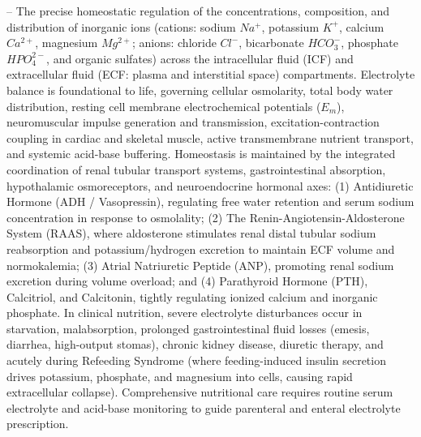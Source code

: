 -- The precise homeostatic regulation of the concentrations, composition, and distribution of inorganic ions (cations: sodium $Na^+$, potassium $K^+$, calcium $Ca^{2+}$, magnesium $Mg^{2+}$; anions: chloride $Cl^-$, bicarbonate $HCO_3^-$, phosphate $HPO_4^{2-}$, and organic sulfates) across the intracellular fluid (ICF) and extracellular fluid (ECF: plasma and interstitial space) compartments. Electrolyte balance is foundational to life, governing cellular osmolarity, total body water distribution, resting cell membrane electrochemical potentials ($E_m$), neuromuscular impulse generation and transmission, excitation-contraction coupling in cardiac and skeletal muscle, active transmembrane nutrient transport, and systemic acid-base buffering. Homeostasis is maintained by the integrated coordination of renal tubular transport systems, gastrointestinal absorption, hypothalamic osmoreceptors, and neuroendocrine hormonal axes: (1) Antidiuretic Hormone (ADH / Vasopressin), regulating free water retention and serum sodium concentration in response to osmolality; (2) The Renin-Angiotensin-Aldosterone System (RAAS), where aldosterone stimulates renal distal tubular sodium reabsorption and potassium/hydrogen excretion to maintain ECF volume and normokalemia; (3) Atrial Natriuretic Peptide (ANP), promoting renal sodium excretion during volume overload; and (4) Parathyroid Hormone (PTH), Calcitriol, and Calcitonin, tightly regulating ionized calcium and inorganic phosphate. In clinical nutrition, severe electrolyte disturbances occur in starvation, malabsorption, prolonged gastrointestinal fluid losses (emesis, diarrhea, high-output stomas), chronic kidney disease, diuretic therapy, and acutely during Refeeding Syndrome (where feeding-induced insulin secretion drives potassium, phosphate, and magnesium into cells, causing rapid extracellular collapse). Comprehensive nutritional care requires routine serum electrolyte and acid-base monitoring to guide parenteral and enteral electrolyte prescription.

